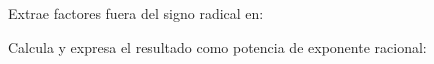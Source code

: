 \documentclass[spanish, 11pt]{exam}
\begin{document}
\begin{questions}
\begin{multicols}{3}
\begin{parts}
        \end{parts}
        \end{multicols}
        \question Extrae factores fuera del signo radical en:
        \begin{multicols}{3} 
        \end{multicols}
        \question Calcula y expresa el resultado como potencia de exponente racional:
        \begin{multicols}{3} 

\end{multicols}
\end{questions}
\end{document}
